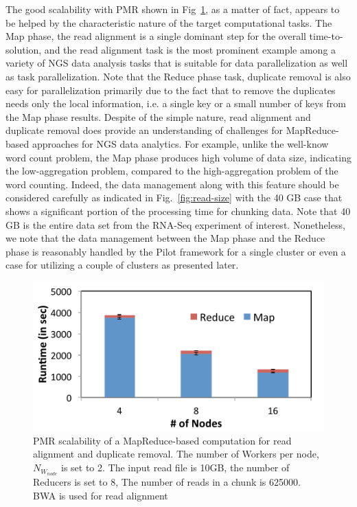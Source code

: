 \documentclass{sig-alternate}
\begin{document}
{The good scalability with PMR shown in Fig~\ref{fig:scale-p-saga-mr}, as a matter of fact, appears to be helped by the characteristic nature of the target computational tasks.  The Map phase, the read alignment is a single dominant step for the overall time-to-solution, and the read alignment task is the most prominent example among a variety of NGS data analysis tasks that is suitable for data parallelization as well as task parallelization.  Note that the Reduce phase task, duplicate removal is also easy for parallelization primarily due to the fact that to remove the duplicates needs only the local information, i.e. a single key or a small number of keys from the Map phase results.  Despite of the simple nature, read alignment and duplicate removal does provide an understanding of challenges for MapReduce-based approaches for NGS data analytics.  For example, unlike the well-know word count problem, the Map phase produces high volume of data size, indicating the low-aggregation problem, compared to the high-aggregation problem of the word counting\cite{weissman-mr-11}.  Indeed, the data management along with this feature should be considered carefully as indicated in Fig.~\ref{fig:read-size} with the 40 GB case that shows a significant portion of the processing time for chunking data.  Note that 40 GB is the entire data set from the RNA-Seq experiment of interest.  Nonetheless, we note that the data management between the Map phase and the Reduce phase is reasonably handled by the Pilot framework for a single cluster or even a case for utilizing a couple of clusters as presented later.


\begin{figure}
 \centering
\includegraphics[scale=0.50]{figures/pj-smr-scale.pdf}
\caption{\small PMR scalability of a MapReduce-based computation for read alignment and duplicate removal.  The number of Workers per node, $N_{W_{node}}$ is set to 2.   The input read file is 10GB, the number of Reducers is set to 8, The number of reads in a chunk is 625000. BWA is used for read alignment}
  \label{fig:scale-p-saga-mr} 
\end{figure}


}
\end{document}
